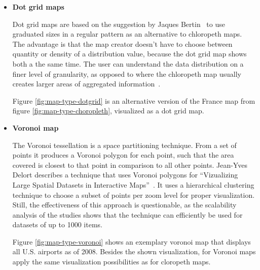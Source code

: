 \begin{itemize}
\item \textbf{Dot grid maps}

Dot grid maps are based on the suggestion by Jaques Bertin~\cite{bertin67graphics, bertin83graphics} to use graduated sizes in a regular pattern as an alternative to chloropeth maps. The advantage is that the map creator doesn't have to choose between quantity or density of a distribution value, because the dot grid map shows both a the same time. The user can understand the data distribution on a finer level of granularity, as opposed to where the chloropeth map usually creates larger areas of aggregated information~\cite{web:dot-grid}.

Figure \ref{fig:map-type-dotgrid} is an alternative version of the France map from figure \ref{fig:map-type-choropleth}, visualized as a dot grid map.


\item \textbf{Voronoi map}

The Voronoi tessellation is a space partitioning technique. From a set of points it produces a Voronoi polygon for each point, such that the area covered is closest to that point in comparison to all other points. Jean-Yves Delort describes a technique that uses Voronoi polygons for ``Vizualizing Large Spatial Datasets in Interactive Maps''~\cite{Delort10vis}. It uses a hierarchical clustering technique to choose a subset of points per zoom level for proper visualization. Still, the effectiveness of this approach is questionable, as the scalability analysis of the studies shows that the technique can efficiently be used for datasets of up to 1000 items.

Figure \ref{fig:map-type-voronoi} shows an exemplary voronoi map that displays all U.S. airports as of 2008. Besides the shown visualization, for Voronoi maps apply the same visualization possibilities as for cloropeth maps.


\end{itemize}
